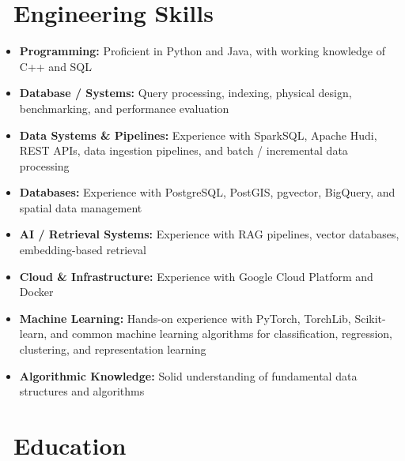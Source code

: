 \documentclass{resume}
\begin{document}
\section{\faCogs\ \textbf{Engineering Skills}}

\begin{itemize}[parsep=0.4ex]

\item \textbf{Programming:} Proficient in Python and Java, with working knowledge of C++ and SQL

\item \textbf{Database / Systems:} Query processing, indexing, physical design, benchmarking, and performance evaluation

\item \textbf{Data Systems \& Pipelines:} Experience with SparkSQL, Apache Hudi, REST APIs, data ingestion pipelines, and batch / incremental data processing

\item \textbf{Databases:} Experience with PostgreSQL, PostGIS, pgvector, BigQuery, and spatial data management

\item \textbf{AI / Retrieval Systems:} Experience with RAG pipelines, vector databases, embedding-based retrieval

\item \textbf{Cloud \& Infrastructure:} Experience with Google Cloud Platform and Docker

\item \textbf{Machine Learning:} Hands-on experience with PyTorch, TorchLib, Scikit-learn, and common machine learning algorithms for classification, regression, clustering, and representation learning

  \item \textbf{Algorithmic Knowledge:} Solid understanding of fundamental data structures and algorithms
\end{itemize}

\section{\faGraduationCap\ \textbf{Education}}
\end{document}

